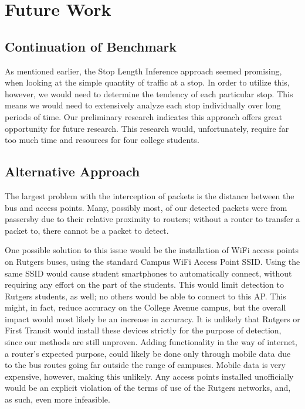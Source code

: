 \section{Future Work}



\subsection{Continuation of Benchmark}
As mentioned earlier, the Stop Length Inference approach seemed promising, when looking at the simple quantity of traffic at a stop.
In order to utilize this, however, we would need to determine the tendency of each particular stop.
This means we would need to extensively analyze each stop individually over long periods of time.
Our preliminary research indicates this approach offers great opportunity for future research.
This research would, unfortunately, require far too much time and resources for four college students.

\subsection{Alternative Approach}
The largest problem with the interception of packets is the distance between the bus and access points.
Many, possibly most, of our detected packets were from passersby due to their relative proximity to routers; without a router to transfer a packet to, there cannot be a packet to detect.

One possible solution to this issue would be the installation of WiFi access points on Rutgers buses, using the standard Campus WiFi Access Point SSID.
Using the same SSID would cause student smartphones to automatically connect, without requiring any effort on the part of the students.
This would limit detection to Rutgers students, as well; no others would be able to connect to this AP.
This might, in fact, reduce accuracy on the College Avenue campus, but the overall impact would most likely be an increase in accuracy.
It is unlikely that Rutgers or First Transit would install these devices strictly for the purpose of detection, since our methods are still unproven.
Adding functionality in the way of internet, a router's expected purpose, could likely be done only through mobile data due to the bus routes going far outside the range of campuses.
Mobile data is very expensive, however, making this unlikely.
Any access points installed unofficially would be an explicit violation of the terms of use of the Rutgers networks, and, as such, even more infeasible.

